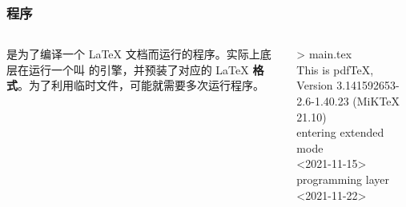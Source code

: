 \begin{frame}
  \frametitle{程序}
  \begin{columns}[c]
    \begin{column}{0.7\textwidth}
      \begin{center}
        \rmfamily\Huge
      \end{center}
      \begin{center}
        \parbox{0.7\textwidth}{
           是为了编译一个 \LaTeX{} 文档而运行的程序。实际上底层在运行一个叫  的引擎，并预装了对应的 \LaTeX{} \textbf{格式}。为了利用临时文件，可能就需要多次运行程序。
        }
      \end{center}
    \end{column}
    \begin{column}{0.3\textwidth}
      \begin{block}{}
        \ttfamily\small
        >  main.tex\\
        This is pdfTeX, Version 3.141592653-
        2.6-1.40.23 (MiKTeX 21.10)\\
        entering extended mode\\
         <2021-11-15>\\
         programming layer <2021-11-22>
      \end{block}
    \end{column}
  \end{columns}
\end{frame}

